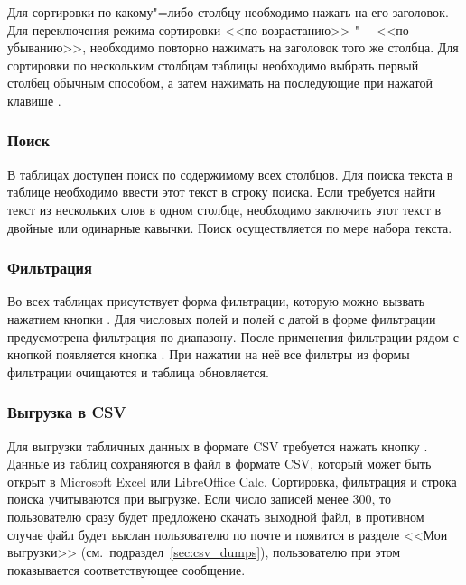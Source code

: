 Для сортировки по какому"=либо столбцу необходимо нажать на его заголовок. Для переключения режима сортировки <<по возрастанию>> "--- <<по убыванию>>,
необходимо повторно нажимать на заголовок того же столбца. Для сортировки по нескольким столбцам таблицы необходимо выбрать первый столбец обычным способом,
а затем нажимать на последующие при нажатой клавише .

\subsubsection{Поиск}

В таблицах доступен поиск по содержимому всех столбцов. Для поиска текста в таблице необходимо ввести этот текст в строку поиска. Если требуется 
найти текст из нескольких слов в одном столбце, необходимо заключить этот текст в двойные или одинарные кавычки. Поиск осуществляется по мере набора текста.

\subsubsection{Фильтрация}

Во всех таблицах присутствует форма фильтрации, которую можно вызвать нажатием кнопки . Для числовых полей и полей с датой в форме фильтрации предусмотрена фильтрация по диапазону. После применения фильтрации рядом с кнопкой  появляется кнопка .
При нажатии на неё все фильтры из формы фильтрации очищаются и таблица обновляется. 

\subsubsection{Выгрузка в CSV}

Для выгрузки табличных данных в формате CSV требуется нажать кнопку . Данные из таблиц
сохраняются в файл в формате CSV, который может быть открыт в Microsoft Excel или LibreOffice Calc. Сортировка, фильтрация и строка
поиска учитываются при выгрузке. Если число записей менее 300, то пользователю сразу будет предложено скачать выходной файл, в противном случае файл будет выслан пользователю по почте и появится в разделе <<Мои выгрузки>>
(см.\ подраздел~\ref{sec:csv_dumps}), пользователю при этом показывается соответствующее сообщение.
